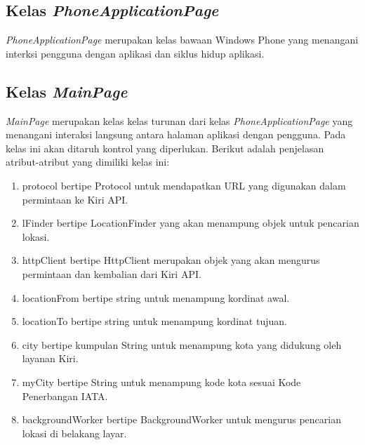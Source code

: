 \subsection{Kelas \textit{PhoneApplicationPage}}
\label{lab:Kelas PhoneApplicationPage}
\hspace{0.5cm} \textit{PhoneApplicationPage} merupakan kelas bawaan Windows Phone yang menangani interksi pengguna dengan aplikasi dan siklus hidup aplikasi.

\subsection{Kelas \textit{MainPage}}
\label{lab:Kelas MainPage}
\hspace{0.5cm} \textit{MainPage} merupakan kelas kelas turunan dari kelas \textit{PhoneApplicationPage} yang menangani interaksi langsung antara halaman aplikasi dengan pengguna. Pada kelas ini akan ditaruh kontrol yang diperlukan. Berikut adalah penjelasan atribut-atribut yang dimiliki kelas ini:
\begin{enumerate}
	\item protocol bertipe Protocol untuk mendapatkan URL yang digunakan dalam permintaan ke Kiri API.
	\item lFinder bertipe LocationFinder yang akan menampung objek untuk pencarian lokasi.
	\item httpClient bertipe HttpClient merupakan objek yang akan mengurus permintaan dan kembalian dari Kiri API.
	\item locationFrom bertipe string untuk menampung kordinat awal.
	\item locationTo bertipe string untuk menampung kordinat tujuan.
	\item city bertipe kumpulan String untuk menampung kota yang didukung oleh layanan Kiri.
	\item myCity bertipe String untuk menampung kode kota sesuai Kode Penerbangan IATA.
	\item backgroundWorker bertipe BackgroundWorker untuk mengurus pencarian lokasi di belakang layar.
\end{enumerate}

